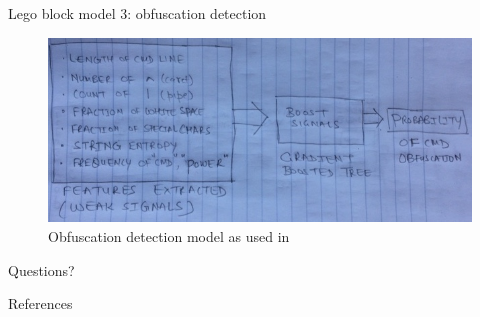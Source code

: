 \documentclass[10pt]{beamer}
\begin{document}
\begin{frame}[fragile]{Lego block model 3: obfuscation detection}
	\begin{figure}
		\includegraphics[scale=0.50]{gbtree}
		\caption{Obfuscation detection model as used in \cite{feye2018}}
	\end{figure}
\end{frame}

\begin{frame}[standout]
  Questions?
\end{frame}

\appendix

\begin{frame}[allowframebreaks]{References}

  
  

\end{frame}
\end{document}
